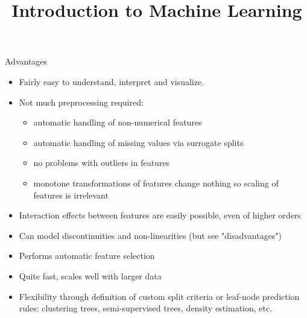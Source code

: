 \documentclass[11pt,compress,t,notes=noshow, xcolor=table]{beamer}
\title{Introduction to Machine Learning}
\institute{\href{https://compstat-lmu.github.io/lecture_i2ml/}{compstat-lmu.github.io/lecture\_i2ml}}
\date{}
\begin{document}
















\sloppy

\begin{vbframe}{Advantages}
  \begin{itemize}
    \item Fairly easy to understand, interpret and visualize.
    \item Not much preprocessing required:
    \begin{itemize}
      \item automatic handling of non-numerical features
      \item automatic handling of missing values via surrogate splits
      \item no problems with outliers in features
      \item monotone transformations of features change nothing so scaling of features is irrelevant
    \end{itemize}
    \item Interaction effects between features are easily possible, even of higher orders
    \item Can model discontinuities and non-linearities (but see "disadvantages")
    
    \framebreak
    
    \item Performs automatic feature selection
    \item Quite fast, scales well with larger data
    \item Flexibility through definition of custom split criteria or leaf-node prediction rules: clustering trees, semi-supervised trees, density estimation, etc.
  \end{itemize}
\end{vbframe}
\end{document}
